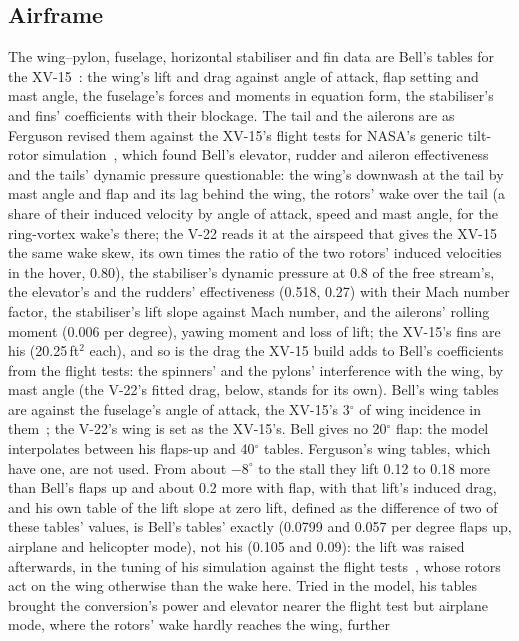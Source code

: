 \documentclass[10pt,a4paper,twocolumn]{article}
\begin{document}
\subsection{Airframe}
The wing--pylon, fuselage, horizontal stabiliser and fin data are Bell's tables for the XV-15~\cite{cr}: the wing's lift and drag
against angle of attack, flap setting and mast angle, the fuselage's forces and moments in equation form, the stabiliser's and fins'
coefficients with their blockage. The tail and the ailerons are as Ferguson revised them against the XV-15's flight tests for NASA's generic
tilt-rotor simulation~\cite{gt}, which found Bell's elevator, rudder and aileron effectiveness and the tails' dynamic pressure questionable: the
wing's downwash at the tail by mast angle and flap and its lag behind the wing, the rotors' wake over the tail (a share of their induced velocity
by angle of attack, speed and mast angle, for the ring-vortex wake's there; the V-22 reads it at the airspeed that gives the XV-15 the same wake
skew, its own times the ratio of the two rotors' induced velocities in the hover, 0.80), the stabiliser's dynamic pressure at 0.8 of the free stream's,
the elevator's and the rudders' effectiveness (0.518, 0.27) with their Mach number factor, the stabiliser's lift slope against Mach number, and the
ailerons' rolling moment (0.006 per degree), yawing moment and loss of lift; the XV-15's fins are his (20.25\,ft$^2$ each), and so is
the drag the XV-15 build adds to Bell's coefficients from the flight tests: the spinners' and the pylons' interference with the wing,
by mast angle (the V-22's fitted drag, below, stands for its own). Bell's wing tables are
against the fuselage's angle of attack, the XV-15's 3$^\circ$ of wing incidence in them~\cite{cr}; the V-22's wing is set as the XV-15's.
Bell gives no 20$^\circ$ flap: the model interpolates between his flaps-up and 40$^\circ$ tables. Ferguson's wing tables, which have one, are not
used. From about $-8^\circ$ to the stall they lift 0.12 to 0.18 more than Bell's flaps up and about 0.2 more with flap, with that lift's induced
drag, and his own table of the lift slope at zero lift, defined as the difference of two of these tables' values, is Bell's tables' exactly
(0.0799 and 0.057 per degree flaps up, airplane and helicopter mode), not his (0.105 and 0.09): the lift was raised afterwards, in the tuning of
his simulation against the flight tests~\cite{gt}, whose rotors act on the wing otherwise than the wake here. Tried in the model, his tables
brought the conversion's power and elevator nearer the flight test but airplane mode, where the rotors' wake hardly reaches the wing, further
\end{document}
